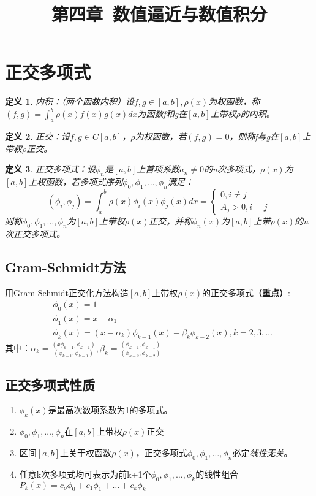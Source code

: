 \documentclass[a4paper]{article}
\newtheorem{definition}{定义}[section]
\begin{document}
\title{第四章\ 数值逼近与数值积分}
\author{}
\date{}
\maketitle

\section{正交多项式}
\begin{definition}
    内积：（两个函数内积）设$f,g \in [a,b], \rho(x)$为权函数，称$(f, g) = \int^b_a\rho(x)f(x)g(x)dx$为函数f和g在$[a,b]$上带权$\rho$的内积。
\end{definition}

\begin{definition}
    正交：设$f,g\in C[a,b]$，$\rho$为权函数，若$(f,g)=0$，则称f与g在$[a,b]$上带权$\rho$正交。
\end{definition}

\begin{definition}
    正交多项式：设$\phi_n$是$[a,b]$上首项系数$a_n\neq 0$的n次多项式，$\rho(x)$为$[a,b]$上权函数，若多项式序列$\phi_0, \phi_1, \dots, \phi_n$满足：
    $$(\phi_i, \phi_j)=\int^b_a\rho(x)\phi_i(x)\phi_j(x)dx = \left\{\begin{array}{lr}
        0, i\neq j \\ A_j > 0, i=j
    \end{array}\right.$$则称$\phi_0, \phi_1, \dots, \phi_n$为$[a,b]$上带权$\rho(x)$正交，并称$\phi_n(x)$为$[a,b]$上带$\rho(x)$的n次正交多项式。
\end{definition}

\subsection{Gram-Schmidt方法}
用Gram-Schmidt正交化方法构造$[a,b]$上带权$\rho(x)$的正交多项式\textbf{（重点）}:
\begin{align*}
    &\phi_0(x) = 1\\
    &\phi_1(x) = x - \alpha_1 \\
    &\phi_k(x) = (x-\alpha_k)\phi_{k-1}(x) - \beta_k\phi_{k-2}(x), k=2,3,\dots
\end{align*}
其中：$\alpha_k = \frac{(x\phi_{k-1}, \phi_{k-1})}{(\phi_{k-1}, \phi_{k-1})}, \beta_k = \frac{(\phi_{k-1}, \phi_{k-1})}{(\phi_{k-2}, \phi_{k-2})}$

\subsection{正交多项式性质}
\begin{enumerate}
    \item $\phi_k(x)$是最高次数项系数为1的多项式。
    \item $\phi_0, \phi_1, \dots, \phi_n$在$[a,b]$上带权$\rho(x)$正交
    \item 区间$[a,b]$上关于权函数$\rho(x)$，正交多项式$\phi_0, \phi_1, \dots, \phi_n$必定\textit{线性无关}。
    \item 任意k次多项式均可表示为前k+1个$\phi_0, \phi_1, \dots, \phi_k$的线性组合$P_k(x) = c_o\phi_0 + c_1\phi_1 + \dots + c_k\phi_k$
\end{enumerate}
\end{document}
